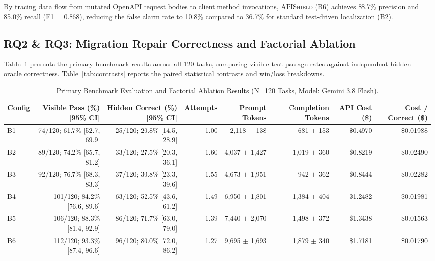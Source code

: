 By tracing data flow from mutated OpenAPI request bodies to client method invocations, \textsc{APIShield} (B6) achieves 88.7\% precision and 85.0\% recall (F1 = 0.868), reducing the false alarm rate to 10.8\% compared to 36.7\% for standard test-driven localization (B2).

\subsection{RQ2 \& RQ3: Migration Repair Correctness and Factorial Ablation}
Table~\ref{tab:primary_benchmark} presents the primary benchmark results across all 120 tasks, comparing visible test passage rates against independent hidden oracle correctness. Table~\ref{tab:contrasts} reports the paired statistical contrasts and win/loss breakdowns.

\begin{table}[t]
\centering\small
\caption{Primary Benchmark Evaluation and Factorial Ablation Results (N=120 Tasks, Model: Gemini 3.8 Flash).}
\label{tab:primary_benchmark}
\begin{tabular}{lrrrrrrr}
\toprule
Config & Visible Pass (\%) [95\% CI] & Hidden Correct (\%) [95\% CI] & Attempts & Prompt Tokens & Completion Tokens & API Cost (\$) & Cost / Correct (\$) \\
\midrule
B1 & 74/120; 61.7\% [52.7, 69.9] & 25/120; 20.8\% [14.5, 28.9] & 1.00 & 2,118 $\pm$ 138 & 681 $\pm$ 153 & \$0.4970 & \$0.01988 \\
B2 & 89/120; 74.2\% [65.7, 81.2] & 33/120; 27.5\% [20.3, 36.1] & 1.60 & 4,037 $\pm$ 1,427 & 1,019 $\pm$ 360 & \$0.8219 & \$0.02490 \\
B3 & 92/120; 76.7\% [68.3, 83.3] & 37/120; 30.8\% [23.3, 39.6] & 1.55 & 4,673 $\pm$ 1,951 & 942 $\pm$ 362 & \$0.8444 & \$0.02282 \\
B4 & 101/120; 84.2\% [76.6, 89.6] & 63/120; 52.5\% [43.6, 61.2] & 1.49 & 6,950 $\pm$ 1,801 & 1,384 $\pm$ 404 & \$1.2482 & \$0.01981 \\
B5 & 106/120; 88.3\% [81.4, 92.9] & 86/120; 71.7\% [63.0, 79.0] & 1.39 & 7,440 $\pm$ 2,070 & 1,498 $\pm$ 372 & \$1.3438 & \$0.01563 \\
B6 & 112/120; 93.3\% [87.4, 96.6] & 96/120; 80.0\% [72.0, 86.2] & 1.27 & 9,695 $\pm$ 1,693 & 1,879 $\pm$ 340 & \$1.7181 & \$0.01790 \\
\bottomrule
\end{tabular}
\end{table}


